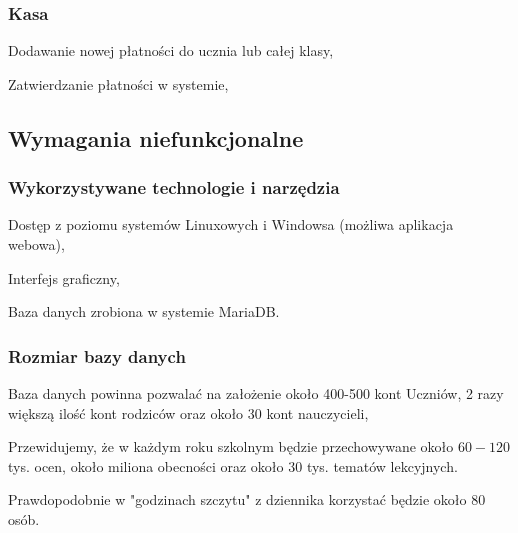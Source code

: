 \documentclass[12pt]{article}
\begin{document}
\subsubsection{Kasa}
\begin{itemize*}
    \item Dodawanie nowej płatności do ucznia lub całej klasy,
    \item Zatwierdzanie płatności w systemie,
\end{itemize*}
\subsection{Wymagania niefunkcjonalne}
\subsubsection{Wykorzystywane technologie i narzędzia}
\begin{itemize*}
    \item Dostęp z poziomu systemów Linuxowych i Windowsa (możliwa aplikacja webowa),
    \item Interfejs graficzny,
    \item Baza danych zrobiona w systemie MariaDB.
\end{itemize*}
\subsubsection{Rozmiar bazy danych}
\begin{itemize*}
    \item Baza danych powinna pozwalać na założenie około 400-500 kont Uczniów, 2 razy większą ilość kont rodziców oraz około 30 kont nauczycieli,
    \item Przewidujemy, że w każdym roku szkolnym będzie przechowywane około $60-120$ tys. ocen, około miliona obecności oraz około $30$ tys. tematów lekcyjnych.
    \item Prawdopodobnie w "godzinach szczytu" z dziennika korzystać będzie około $80$ osób.
\end{itemize*}
\end{document}

